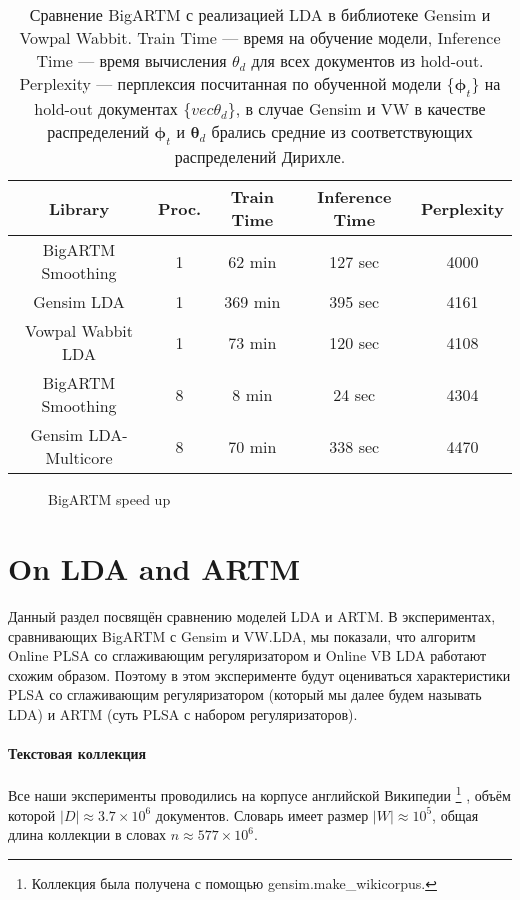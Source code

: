 \documentclass{article}
\renewcommand{\vec}[1]{{\boldsymbol #1}}
\begin{document}
\begin{table}
	\centering
	\label{tab:libraries_comparison}

	\begin{tabular}[t]{c|c|ccc}
	\hline
	Library & Proc. & Train Time & Inference Time & Perplexity \\
	\hline
	BigARTM Smoothing & 1 & 62 min & 127 sec & 4000 \\
	Gensim LDA & 1 & 369 min & 395 sec & 4161 \\
	Vowpal Wabbit LDA & 1 & 73 min & 120 sec & 4108 \\
	\hline
	BigARTM Smoothing & 8 & 8 min & 24 sec & 4304 \\
	Gensim LDA-Multicore & 8 & 70 min & 338 sec & 4470 \\
	\end{tabular}
	\caption{Сравнение BigARTM с реализацией LDA в библиотеке Gensim и Vowpal Wabbit. Train Time — время на обучение модели, Inference Time — время вычисления $\theta_d$ для всех документов из hold-out. Perplexity — перплексия посчитанная по обученной модели $\{\vec{\phi}_t\}$ на hold-out документах $\{vec{\theta}_d\}$, в случае Gensim и VW в качестве распределений $\vec{\phi}_t$ и $\vec{\theta}_d$ брались средние из соответствующих распределений Дирихле.}
\end{table}

\begin{figure}
	\centering
	\label{fig:bigartm_speedup}
	\caption{BigARTM speed up }
\end{figure}



\section{On LDA and ARTM}

Данный раздел посвящён сравнению моделей LDA и ARTM. В экспериментах, сравнивающих BigARTM с Gensim и VW.LDA, мы показали, что алгоритм Online PLSA со сглаживающим регуляризатором и Online VB LDA работают схожим образом. Поэтому в этом эксперименте будут оцениваться характеристики PLSA со сглаживающим регуляризатором (который мы далее будем называть LDA) и ARTM (суть PLSA с набором регуляризаторов).

\paragraph{Текстовая коллекция} Все наши эксперименты проводились на корпусе английской Википедии
\footnote{Коллекция была получена с помощью gensim.make\_wikicorpus.}
, объём которой $|D| \approx 3.7 \times 10^6$ документов. Словарь имеет размер $|W| \approx 10^5$, общая длина коллекции в словах $n \approx 577 \times 10^6$.
\end{document}
